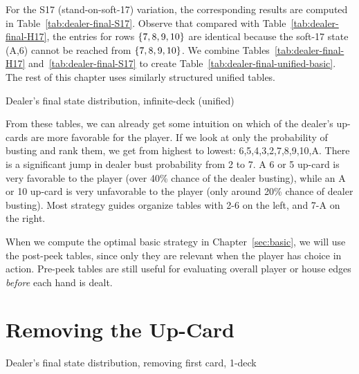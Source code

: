 For the S17 (stand-on-soft-17) variation, the corresponding results are
computed in Table~\ref{tab:dealer-final-S17}.
Observe that compared with Table~\ref{tab:dealer-final-H17},
the entries for rows $\left\{7,8,9,10\right\}$ are identical because the
soft-17 state (A,6) cannot be reached from $\left\{7,8,9,10\right\}$.
We combine Tables~\ref{tab:dealer-final-H17} and~\ref{tab:dealer-final-S17}
to create Table~\ref{tab:dealer-final-unified-basic}.
The rest of this chapter uses similarly structured unified tables.  

\begin{table}[ht!]
\caption{Dealer's final state distribution, infinite-deck (unified)}
\begin{center}

\end{center}
\label{tab:dealer-final-unified-basic}
\end{table}

From these tables, we can already get some intuition on
which of the dealer's up-cards are more favorable for the player.
If we look at only the probability of busting and rank them, 
we get from highest to lowest: 6,5,4,3,2,7,8,9,10,A.
There is a significant jump in dealer bust probability from 2 to 7.  
A 6 or 5 up-card is very favorable to the player (over 40\% chance of 
the dealer busting), 
while an A or 10 up-card is very unfavorable to the player
(only around 20\% chance of dealer busting).
Most strategy guides organize tables with 2-6 on the left, 
and 7-A on the right.


When we compute the optimal basic strategy in Chapter~\ref{sec:basic}, 
we will use the post-peek tables, since only they are relevant
when the player has choice in action.  
Pre-peek tables are still useful for evaluating overall player or house
edges \emph{before} each hand is dealt.

\section{Removing the Up-Card}
\label{sec:dealer:reveal}

\begin{table}[ht!]
\caption{Dealer's final state distribution, removing first card, 1-deck}
\begin{center}

\end{center}
\label{tab:dealer-final-unified-dynamic-1}
\end{table}

